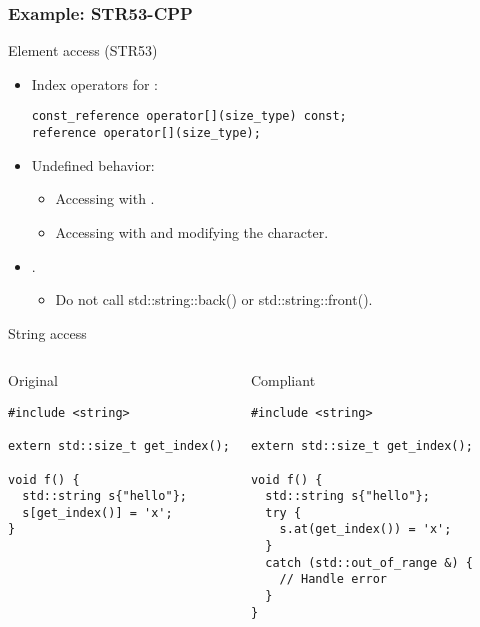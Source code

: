 \subsubsection{Example: STR53-CPP}

\begin{frame}[t,fragile]{Element access (STR53)}
\begin{itemize}
  \item Index operators for :
\begin{lstlisting}
const_reference operator[](size_type) const;
reference operator[](size_type);
\end{lstlisting}

  \vfill
  \item Undefined behavior:
    \begin{itemize}
      \item Accessing with .
      \item Accessing with  and modifying the character.
    \end{itemize}

  \vfill
  \item {}.
    \begin{itemize}
      \item Do not call std::string::back() or std::string::front().
    \end{itemize}
\end{itemize}
\end{frame}

\begin{frame}[t,fragile]{String access}
\begin{columns}

\begin{block}{Original}
\begin{lstlisting}
#include <string>

extern std::size_t get_index();

void f() {
  std::string s{"hello"};
  s[get_index()] = 'x';
}
\end{lstlisting}
\end{block}

\pause
{}
\begin{block}{Compliant}
\begin{lstlisting}[escapechar=@]
#include <string>

extern std::size_t get_index();

void f() {
  std::string s{"hello"};
  try {
    s.at(get_index()) = 'x';
  }
  catch (std::out_of_range &) {
    // Handle error
  }
}
\end{lstlisting}
\end{block}

\end{columns}
\end{frame}

